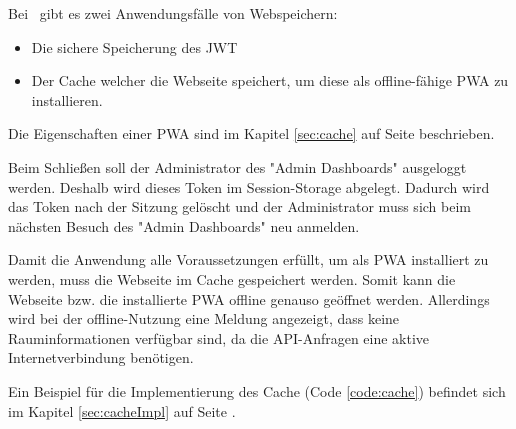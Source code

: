 
Bei \ZELIA\ gibt es zwei Anwendungsfälle von Webspeichern:

\begin{itemize}
    \item Die sichere Speicherung des JWT
    \item Der Cache welcher die Webseite speichert, um diese als offline-fähige PWA zu installieren.
\end{itemize}

Die Eigenschaften einer PWA sind im Kapitel \ref{sec:cache} auf Seite \pageref{sec:cache} beschrieben.


Beim Schließen soll der Administrator des "Admin Dashboards" ausgeloggt werden. 
Deshalb wird dieses Token im Session-Storage abgelegt. 
Dadurch wird das Token nach der Sitzung gelöscht und der Administrator muss sich beim nächsten Besuch des "Admin Dashboards" neu anmelden.


Damit die Anwendung alle Voraussetzungen erfüllt, um als PWA installiert zu werden, muss die Webseite im Cache gespeichert werden. 
Somit kann die Webseite bzw. die installierte PWA offline genauso geöffnet werden. 
Allerdings wird bei der offline-Nutzung eine Meldung angezeigt, dass keine Rauminformationen verfügbar sind, da die API-Anfragen eine aktive Internetverbindung benötigen.

Ein Beispiel für die Implementierung des Cache (Code \ref{code:cache}) befindet sich im Kapitel \ref{sec:cacheImpl} auf Seite \pageref{code:cache}.
 